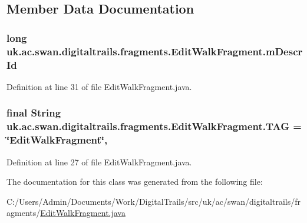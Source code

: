 \subsection{Member Data Documentation}
\hypertarget{classuk_1_1ac_1_1swan_1_1digitaltrails_1_1fragments_1_1_edit_walk_fragment_adc1bc6db32e11a7e404a155f0d21f8b6}{
\subsubsection[{m\+Descr\+Id}]{\setlength{\rightskip}{0pt plus 5cm}long uk.\+ac.\+swan.\+digitaltrails.\+fragments.\+Edit\+Walk\+Fragment.\+m\+Descr\+Id\hspace{0.3cm}{\ttfamily [private]}}}\label{classuk_1_1ac_1_1swan_1_1digitaltrails_1_1fragments_1_1_edit_walk_fragment_adc1bc6db32e11a7e404a155f0d21f8b6}


Definition at line 31 of file Edit\+Walk\+Fragment.\+java.

\hypertarget{classuk_1_1ac_1_1swan_1_1digitaltrails_1_1fragments_1_1_edit_walk_fragment_aebb6ba79e76b59ec1e6db49d48321f28}{
\subsubsection[{T\+A\+G}]{\setlength{\rightskip}{0pt plus 5cm}final String uk.\+ac.\+swan.\+digitaltrails.\+fragments.\+Edit\+Walk\+Fragment.\+T\+A\+G = \char`\"{}Edit\+Walk\+Fragment\char`\"{}\hspace{0.3cm}{\ttfamily [static]}, {\ttfamily [private]}}}\label{classuk_1_1ac_1_1swan_1_1digitaltrails_1_1fragments_1_1_edit_walk_fragment_aebb6ba79e76b59ec1e6db49d48321f28}


Definition at line 27 of file Edit\+Walk\+Fragment.\+java.



The documentation for this class was generated from the following file\+:\begin{DoxyCompactItemize}
\item 
C\+:/\+Users/\+Admin/\+Documents/\+Work/\+Digital\+Trails/src/uk/ac/swan/digitaltrails/fragments/\hyperlink{_edit_walk_fragment_8java}{Edit\+Walk\+Fragment.\+java}\end{DoxyCompactItemize}
